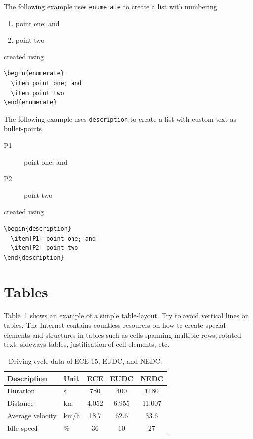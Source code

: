 The following example uses \texttt{enumerate} to create a list with numbering
\begin{enumerate}
  \item point one; and
  \item point two
\end{enumerate}
created using
\begin{verbatim}
\begin{enumerate}
  \item point one; and
  \item point two
\end{enumerate}
\end{verbatim}

The following example uses \texttt{description} to create a list with custom text as bullet-points
\begin{description}
  \item[P1] point one; and
  \item[P2] point two
\end{description}
created using
\begin{verbatim}
\begin{description}
  \item[P1] point one; and
  \item[P2] point two
\end{description}
\end{verbatim}


\section{Tables}\label{sec:tables}
Table~\ref{tab:table} shows an example of a simple table-layout. Try to avoid vertical lines on tables. The Internet contains countless resources on how to create special elements and structures in tables such as cells spanning multiple rows, rotated text, sideways tables, justification of cell elements, etc.
\begin{table}[ht]
\begin{center}
\caption{Driving cycle data of ECE-15, EUDC, and NEDC.}\vspace{1ex}
\label{tab:table}
\begin{tabular}{llccc}\hline
Description & Unit & ECE & EUDC & NEDC \\ \hline
Duration & s & 780 & 400 & 1180 \\
Distance & km & 4.052 & 6.955 & 11.007 \\
Average velocity & km/h & 18.7 &  62.6 & 33.6 \\
Idle speed & \% & 36 & 10 & 27 \\ \hline
\end{tabular}
\end{center}
\end{table}

